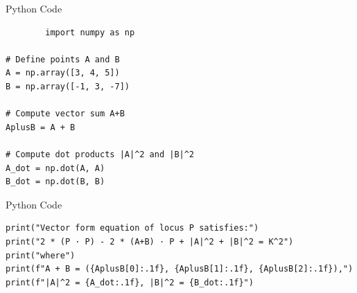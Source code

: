 \documentclass{beamer}
\begin{document}
\begin{frame}[fragile]{Python Code}
    \begin{verbatim}
        import numpy as np

# Define points A and B
A = np.array([3, 4, 5])
B = np.array([-1, 3, -7])

# Compute vector sum A+B
AplusB = A + B

# Compute dot products |A|^2 and |B|^2
A_dot = np.dot(A, A)
B_dot = np.dot(B, B)
    \end{verbatim}
\end{frame}

\begin{frame}[fragile]{Python Code}
    \begin{verbatim}
print("Vector form equation of locus P satisfies:")
print("2 * (P · P) - 2 * (A+B) · P + |A|^2 + |B|^2 = K^2")
print("where")
print(f"A + B = ({AplusB[0]:.1f}, {AplusB[1]:.1f}, {AplusB[2]:.1f}),")
print(f"|A|^2 = {A_dot:.1f}, |B|^2 = {B_dot:.1f}")

    \end{verbatim}
\end{frame}
\end{document}
